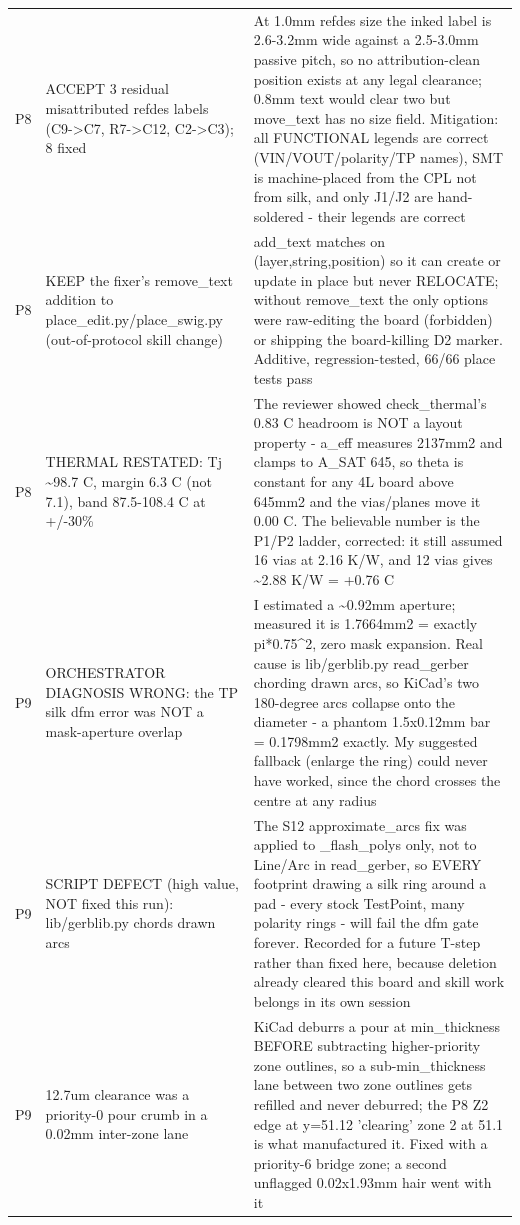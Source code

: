 \documentclass[11pt,a4paper]{article}
\begin{document}
{\begin{longtable}{lp{5.2cm}p{7.2cm}}
P8 & ACCEPT 3 residual misattributed refdes labels (C9-\textgreater{}C7, R7-\textgreater{}C12, C2-\textgreater{}C3); 8 fixed & At 1.0mm refdes size the inked label is 2.6-3.2mm wide against a 2.5-3.0mm passive pitch, so no attribution-clean position exists at any legal clearance; 0.8mm text would clear two but move\_text has no size field. Mitigation: all FUNCTIONAL legends are correct (VIN/VOUT/polarity/TP names), SMT is machine-placed from the CPL not from silk, and only J1/J2 are hand-soldered - their legends are correct \\
P8 & KEEP the fixer's remove\_text addition to place\_edit.py/place\_swig.py (out-of-protocol skill change) & add\_text matches on (layer,string,position) so it can create or update in place but never RELOCATE; without remove\_text the only options were raw-editing the board (forbidden) or shipping the board-killing D2 marker. Additive, regression-tested, 66/66 place tests pass \\
P8 & THERMAL RESTATED: Tj \textasciitilde{}98.7 C, margin 6.3 C (not 7.1), band 87.5-108.4 C at +/-30\% & The reviewer showed check\_thermal's 0.83 C headroom is NOT a layout property - a\_eff measures 2137mm2 and clamps to A\_SAT 645, so theta is constant for any 4L board above 645mm2 and the vias/planes move it 0.00 C. The believable number is the P1/P2 ladder, corrected: it still assumed 16 vias at 2.16 K/W, and 12 vias gives \textasciitilde{}2.88 K/W = +0.76 C \\
P9 & ORCHESTRATOR DIAGNOSIS WRONG: the TP silk dfm error was NOT a mask-aperture overlap & I estimated a \textasciitilde{}0.92mm aperture; measured it is 1.7664mm2 = exactly pi{*}0.75\textasciicircum{}2, zero mask expansion. Real cause is lib/gerblib.py read\_gerber chording drawn arcs, so KiCad's two 180-degree arcs collapse onto the diameter - a phantom 1.5x0.12mm bar = 0.1798mm2 exactly. My suggested fallback (enlarge the ring) could never have worked, since the chord crosses the centre at any radius \\
P9 & SCRIPT DEFECT (high value, NOT fixed this run): lib/gerblib.py chords drawn arcs & The S12 approximate\_arcs fix was applied to \_flash\_polys only, not to Line/Arc in read\_gerber, so EVERY footprint drawing a silk ring around a pad - every stock TestPoint, many polarity rings - will fail the dfm gate forever. Recorded for a future T-step rather than fixed here, because deletion already cleared this board and skill work belongs in its own session \\
P9 & 12.7um clearance was a priority-0 pour crumb in a 0.02mm inter-zone lane & KiCad deburrs a pour at min\_thickness BEFORE subtracting higher-priority zone outlines, so a sub-min\_thickness lane between two zone outlines gets refilled and never deburred; the P8 Z2 edge at y=51.12 'clearing' zone 2 at 51.1 is what manufactured it. Fixed with a priority-6 bridge zone; a second unflagged 0.02x1.93mm hair went with it \\

\end{longtable}}
\end{document}
